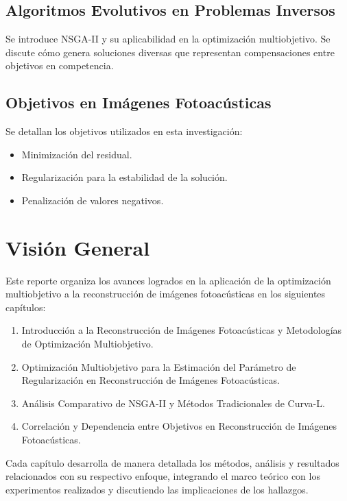 \subsection*{Algoritmos Evolutivos en Problemas Inversos}

Se introduce NSGA-II y su aplicabilidad en la optimización multiobjetivo. Se discute cómo genera soluciones diversas que representan compensaciones entre objetivos en competencia.

\subsection*{Objetivos en Imágenes Fotoacústicas}

Se detallan los objetivos utilizados en esta investigación:

\begin{itemize}
    \item Minimización del residual.
    \item Regularización para la estabilidad de la solución.
    \item Penalización de valores negativos.
\end{itemize}

\section{Visión General} \label{sec:thes}

Este reporte organiza los avances logrados en la aplicación de la optimización multiobjetivo a la reconstrucción de imágenes fotoacústicas en los siguientes capítulos:

\begin{enumerate}[start=1,label={Capítulo \arabic*:},wide = 0pt, leftmargin = 3em]
    \item Introducción a la Reconstrucción de Imágenes Fotoacústicas y Metodologías de Optimización Multiobjetivo.
    \item Optimización Multiobjetivo para la Estimación del Parámetro de Regularización en Reconstrucción de Imágenes Fotoacústicas.
    \item Análisis Comparativo de NSGA-II y Métodos Tradicionales de Curva-L.
    \item Correlación y Dependencia entre Objetivos en Reconstrucción de Imágenes Fotoacústicas.
\end{enumerate}

Cada capítulo desarrolla de manera detallada los métodos, análisis y resultados relacionados con su respectivo enfoque, integrando el marco teórico con los experimentos realizados y discutiendo las implicaciones de los hallazgos.

